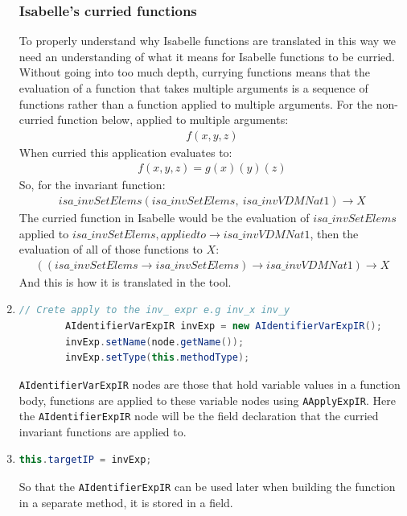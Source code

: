 \begin{enumerate}
		\subsubsection{Isabelle's curried functions} \label{icf}
		To properly understand why Isabelle functions are translated in this way we need an understanding of what it means for Isabelle functions to be curried. Without going into too much depth, currying functions means that the evaluation of a function that takes multiple arguments is a sequence of functions rather than a function applied to multiple arguments. For the non-curried function below, applied to multiple arguments:
		\begin{align}
		f(x,y,z)
		\end{align} 
		When curried this application evaluates to:
		\begin{align}
 		f(x,y,z) = g(x)(y)(z)
		\end{align} 
		So, for the invariant function:
		\begin{align}
		isa\_invSetElems(isa\_invSetElems,\:isa\_invVDMNat1) \to X
		\end{align}
		The curried function in Isabelle would be the evaluation of $isa\_invSetElems$ applied to $isa\_invSetElems, applied to \to isa\_invVDMNat1$, then the evaluation of all of those functions to $X$:
		\begin{align}
		((isa\_invSetElems \to isa\_invSetElems) \to isa\_invVDMNat1) \to X
		\end{align}
		And this is how it is translated in the tool.
		\hfill\break
		\hfill\break
		\item \begin{lstlisting}[language=Java]
		// Crete apply to the inv_ expr e.g inv_x inv_y
        AIdentifierVarExpIR invExp = new AIdentifierVarExpIR();
        invExp.setName(node.getName());
        invExp.setType(this.methodType);
		\end{lstlisting}
		\lstinline[language=Java]{AIdentifierVarExpIR} nodes are those that hold variable values in a function body, functions are applied to these variable nodes using \lstinline[language=Java]{AApplyExpIR}. Here the \lstinline[language=Java]{AIdentifierExpIR} node will be the field declaration that the curried invariant functions are applied to.
		\item \begin{lstlisting}[language=Java]
		this.targetIP = invExp;
	    \end{lstlisting}
	    So that the \lstinline[language=Java]{AIdentifierExpIR} can be used later when building the function in a separate method, it is stored in a field.

\end{enumerate}
